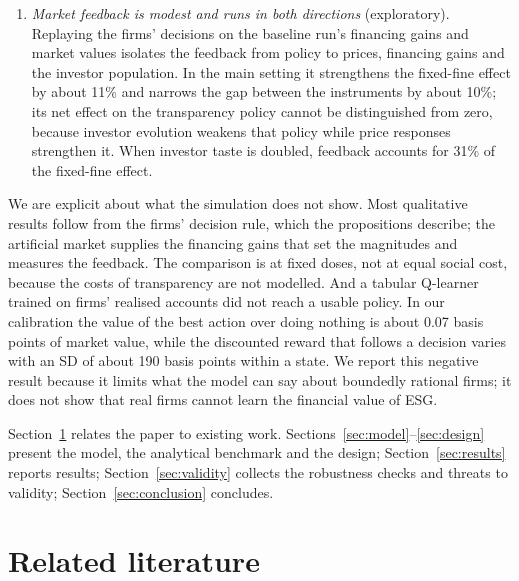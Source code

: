 \documentclass[11pt]{article}
\begin{document}
\begin{enumerate}[leftmargin=*]
\item \emph{Market feedback is modest and runs in both directions} (exploratory). Replaying the firms' decisions on the baseline run's financing gains and market values isolates the feedback from policy to prices, financing gains and the investor population. In the main setting it strengthens the fixed-fine effect by about 11\% and narrows the gap between the instruments by about 10\%; its net effect on the transparency policy cannot be distinguished from zero, because investor evolution weakens that policy while price responses strengthen it. When investor taste is doubled, feedback accounts for 31\% of the fixed-fine effect.
\end{enumerate}

We are explicit about what the simulation does not show. Most qualitative results follow from the firms' decision rule, which the propositions describe; the artificial market supplies the financing gains that set the magnitudes and measures the feedback. The comparison is at fixed doses, not at equal social cost, because the costs of transparency are not modelled. And a tabular Q-learner \citep{watkins1992qlearning} trained on firms' realised accounts did not reach a usable policy. In our calibration the value of the best action over doing nothing is about 0.07 basis points of market value, while the discounted reward that follows a decision varies with an SD of about 190 basis points within a state. We report this negative result because it limits what the model can say about boundedly rational firms; it does not show that real firms cannot learn the financial value of ESG.

Section~\ref{sec:literature} relates the paper to existing work. Sections~\ref{sec:model}--\ref{sec:design} present the model, the analytical benchmark and the design; Section~\ref{sec:results} reports results; Section~\ref{sec:validity} collects the robustness checks and threats to validity; Section~\ref{sec:conclusion} concludes.

\section{Related literature}\label{sec:literature}
\end{document}
